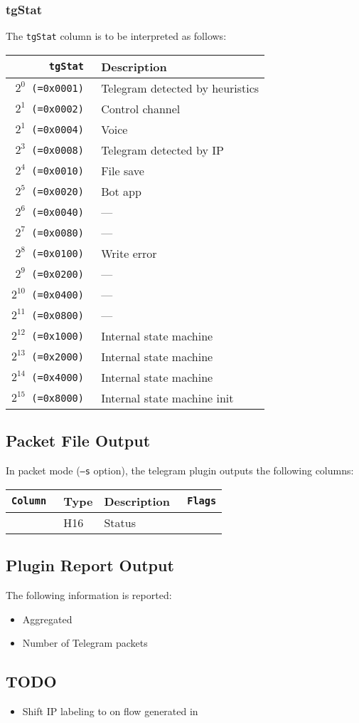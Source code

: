 \documentclass[documentation]{subfiles}
\begin{document}
\subsubsection{tgStat}\label{tgStat}
The {\tt tgStat} column is to be interpreted as follows:
\begin{longtable}{>{\tt}rl}
    \toprule
    {\bf tgStat} & {\bf Description}\\
    \midrule\endhead%
    $2^{0}$  (=0x0001) & Telegram detected by heuristics\\
    $2^{1}$  (=0x0002) & Control channel\\
    $2^{1}$  (=0x0004) & Voice\\
    $2^{3}$  (=0x0008) & Telegram detected by IP\\
    $2^{4}$  (=0x0010) & File save\\
    $2^{5}$  (=0x0020) & Bot app\\
    $2^{6}$  (=0x0040) & ---\\
    $2^{7}$  (=0x0080) & ---\\
    $2^{8}$  (=0x0100) & Write error\\
    $2^{9}$  (=0x0200) & ---\\
    $2^{10}$ (=0x0400) & ---\\
    $2^{11}$ (=0x0800) & ---\\
    $2^{12}$ (=0x1000) & Internal state machine \\
    $2^{13}$ (=0x2000) & Internal state machine \\
    $2^{14}$ (=0x4000) & Internal state machine \\
    $2^{15}$ (=0x8000) & Internal state machine init\\
    \bottomrule
\end{longtable}

\subsection{Packet File Output}
In packet mode ({\tt --s} option), the telegram plugin outputs the following columns:
\begin{longtable}{>{\tt}lll>{\tt\small}l}
    \toprule
    {\bf Column} & {\bf Type} & {\bf Description} & {\bf Flags}\\
    \midrule\endhead%
    \nameref{tgStat} & H16 & Status & \\
    \bottomrule
\end{longtable}

\subsection{Plugin Report Output}
The following information is reported:
\begin{itemize}
    \item Aggregated {\tt{}}
    \item Number of Telegram packets
\end{itemize}

\subsection{TODO}
\begin{itemize}
    \item Shift IP labeling to on flow generated in 
\end{itemize}
\end{document}
